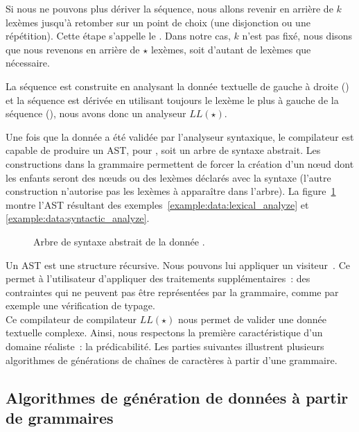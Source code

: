 Si nous ne pouvons plus dériver la séquence, nous allons revenir en arrière de
$k$ lexèmes jusqu'à retomber sur un point de choix (une disjonction ou une
répétition). Cette étape s'appelle le . Dans notre cas,
$k$ n'est pas fixé, nous disons que nous revenons en arrière de $\star$ lexèmes,
soit d'autant de lexèmes que nécessaire.

La séquence est construite en analysant la donnée textuelle de gauche à droite
() et la séquence est dérivée en utilisant
toujours le lexème le plus à gauche de la séquence (), nous avons donc un analyseur $LL(\star)$.

Une fois que la donnée a été validée par l'analyseur syntaxique, le compilateur
est capable de produire un AST, pour , soit un
arbre de syntaxe abstrait. Les constructions  dans la grammaire
permettent de forcer la création d'un nœud dont les enfants seront des nœuds ou
des lexèmes déclarés avec la syntaxe  (l'autre construction
 n'autorise pas les lexèmes à apparaître dans l'arbre). La
figure~\ref{figure:data:ast} montre l'AST résultant des
exemples~\ref{example:data:lexical_analyze} et
\ref{example:data:syntactic_analyze}.
%
\begin{figure}


\caption{\label{figure:data:ast} Arbre de syntaxe abstrait de la donnée .}

\end{figure}
%
Un AST est une structure récursive. Nous pouvons lui appliquer un {\strong
visiteur}~. Ce  permet à
l'utilisateur d'appliquer des traitements supplémentaires~: des contraintes qui
ne peuvent pas être représentées par la grammaire, comme par exemple une
vérification de typage. \\

Ce compilateur de compilateur $LL(\star)$ nous permet de valider une donnée
textuelle complexe. Ainsi, nous respectons la première caractéristique d'un
domaine réaliste~: la prédicabilité. Les parties suivantes illustrent plusieurs
algorithmes de générations de chaînes de caractères à partir d'une grammaire.

\subsection{Algorithmes de génération de données à partir de grammaires}
\label{subsection:data:algorithms}

